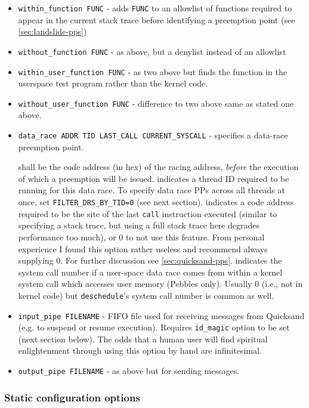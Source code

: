 \begin{itemize}
	\item {\tt within\_function FUNC} - adds {\tt FUNC} to an allowlist of functions required to appear in the current stack trace before identifying a preemption point (see \cref{sec:landslide-pps})
	\item {\tt without\_function FUNC} - as above, but a denylist instead of an allowlist
	\item {\tt within\_user\_function FUNC} - as two above but finds the function in the userspace test program rather than the kernel code.
	\item {\tt without\_user\_function FUNC} - difference to two above same as stated one above.
	\item {\tt data\_race ADDR TID LAST\_CALL CURRENT\_SYSCALL} - specifies a data-race preemption point.
		\begin{itemize}
			 shall be the code address (in hex) of the racing address,
			{\em before} the execution of which a preemption will be issued.
			 indicates a thread ID required to be running for this data race.
				To specify data race PPs across all threads at once, set {\tt FILTER\_DRS\_BY\_TID=0} (see next section).
			 indicates a code address required to be the site of the last {\tt call} instruction executed
				(similar to specifying a stack trace, but using a full stack trace here degrades performance too much),
				or 0 to not use this feature.
				From personal experience I found this option rather useless and recommend always supplying 0.
				For further discussion see \cref{sec:quicksand-pps}.
			 indicates the system call number if a user-space data race comes from within a kernel system call which accesses user memory (Pebbles only).
				Usually 0 (i.e., not in kernel code) but {\tt deschedule}'s system call number is common as well.
		\end{itemize}
	\item {\tt input\_pipe FILENAME} - FIFO file used for receiving messages from Quicksand (e.g. to suspend or resume execution).
		Requires {\tt id\_magic} option to be set (next section below).
		The odds that a human user will find spiritual enlightenment through using this option by hand are infinitesimal.
	\item {\tt output\_pipe FILENAME} - as above but for sending messages.
\end{itemize}

\subsubsection{Static configuration options}
\label{sec:landslide-staticconfig}

